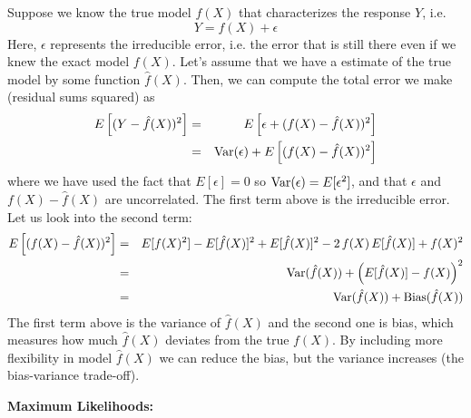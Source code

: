 \documentclass[aps,prl,preprint,superscriptaddress]{revtex4-1}
\begin{document}
Suppose we know the true model $f(X)$ that characterizes the response $Y$, i.e.
%
\begin{equation}
Y = f(X) + \epsilon
\end{equation}
%
Here, $\epsilon$ represents the irreducible error, i.e. the error that is still there even if we knew the exact model $f(X)$. 
Let's assume that we have a estimate of the true model by some function $\hat{f}(X)$. Then, we can compute the total 
error we make (residual sums squared) as
%
\begin{eqnarray}
E\left[ (Y - \hat{f}(X))^2 \right] &=& E \left[ \epsilon + (f(X) - \hat{f}(X))^2 \right] \nonumber\\
&=& {\rm Var}(\epsilon) + E\left[ (f(X) - \hat{f}(X))^2 \right] 
\end{eqnarray}
% 
where we have used the fact that $E[\epsilon]=0$ so ${\rm Var}(\epsilon) = E[\epsilon^2]$, and that $\epsilon$ and
$f(X) - \hat{f}(X)$ are uncorrelated. The first term above is the irreducible error. Let us look into the
second term:
%
\begin{eqnarray}
E\left[ (f(X) - \hat{f}(X))^2 \right] &=& E[ f(X)^2 ] - E[\hat{f}(X)]^2 + E[\hat{f}(X)]^2 - 2\, f(X)\, E[\hat{f}(X)] + f(X)^2 \nonumber\\
 &=& {\rm Var}(\hat{f}(X)) + \left( E[\hat{f}(X)] - f(X) \right)^2 \nonumber\\
 &=& {\rm Var}(\hat{f}(X)) + {\rm Bias}(\hat{f}(X))
\end{eqnarray}
%
The first term above is the variance of $\hat{f}(X)$ and the second one is bias, which measures how much $\hat{f}(X)$ 
deviates from the true $f(X)$. By including more flexibility in model $\hat{f}(X)$ we can reduce the bias, but the
variance increases (the bias-variance trade-off).

\vspace{0.5cm}

{\bf Maximum Likelihoods:}
\end{document}
